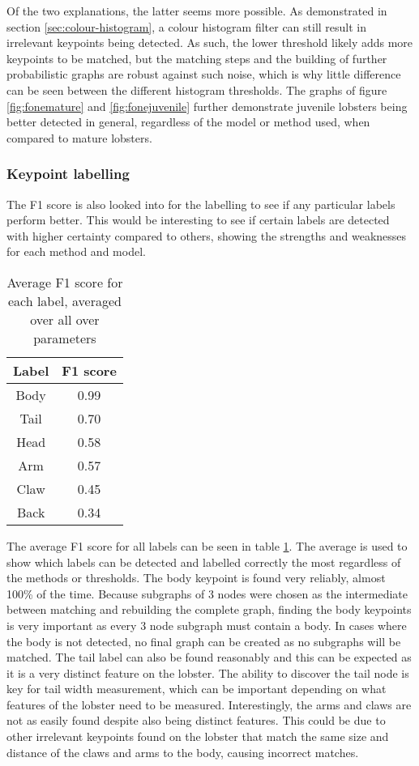 Of the two explanations, the latter seems more possible. As demonstrated in section \ref{sec:colour-histogram}, a colour histogram filter can still result in irrelevant keypoints being detected. As such, the lower threshold likely adds more keypoints to be matched, but the matching steps and the building of further probabilistic graphs are robust against such noise, which is why little difference can be seen between the different histogram thresholds. 
\n
The graphs of figure \ref{fig:fonemature} and \ref{fig:fonejuvenile} further demonstrate juvenile lobsters being better detected in general, regardless of the model or method used, when compared to mature lobsters. 
\subsubsection{Keypoint labelling}
The F1 score is also looked into for the labelling to see if any particular labels perform better. This would be interesting to see if certain labels are detected with higher certainty compared to others, showing the strengths and weaknesses for each method and model.

\begin{table}[H]
\centering
\begin{tabular}{| c | c |}
\hline
\textbf{Label} & \textbf{F1 score} \\
\hline
Body & 0.99 \\
Tail & 0.70 \\
Head & 0.58 \\
Arm & 0.57 \\
Claw & 0.45 \\
Back & 0.34 \\
\hline
\end{tabular}
\caption{Average F1 score for each label, averaged over all over parameters}
\label{tbl:avg-allf1}
\end{table}
\noindent
The average F1 score for all labels can be seen in table \ref{tbl:avg-allf1}. The average is used to show which labels can be detected and labelled correctly the most regardless of the methods or thresholds. The body keypoint is found very reliably, almost 100\% of the time. Because subgraphs of 3 nodes were chosen as the intermediate between matching and rebuilding the complete graph, finding the body keypoints is very important as every 3 node subgraph must contain a body. In cases where the body is not detected, no final graph can be created as no subgraphs will be matched.
\n
The tail label can also be found reasonably and this can be expected as it is a very distinct feature on the lobster. The ability to discover the tail node is key for tail width measurement, which can be important depending on what features of the lobster need to be measured. Interestingly, the arms and claws are not as easily found despite also being distinct features. This could be due to other irrelevant keypoints found on the lobster that match the same size and distance of the claws and arms to the body, causing incorrect matches. 

